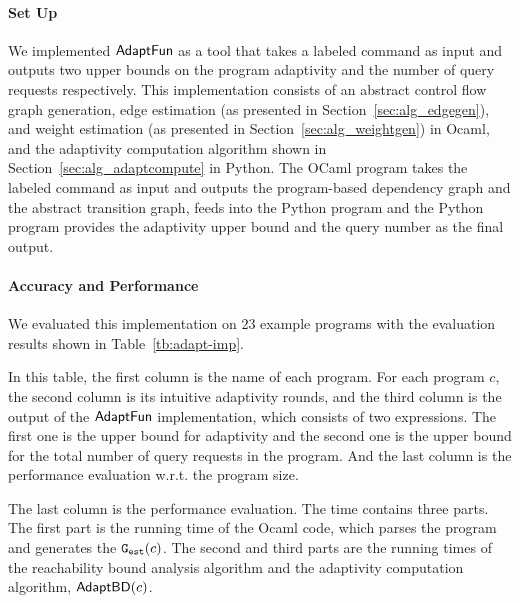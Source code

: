 
\paragraph{Set Up}
We implemented $\textsf{AdaptFun}$ as a tool that takes a labeled command as input 
and outputs two upper bounds on the program adaptivity and the number of query requests respectively.
This implementation consists of an 
abstract control flow graph generation,
edge estimation (as presented in Section~\ref{sec:alg_edgegen}), and weight estimation (as presented in Section~\ref{sec:alg_weightgen}) in Ocaml, 
and the adaptivity computation algorithm shown in Section~\ref{sec:alg_adaptcompute} in Python.
The OCaml program takes the labeled command as input and outputs the program-based dependency graph and
the abstract transition graph,
feeds into the Python program and the Python program provides the adaptivity upper bound and the query number as the final output.


\paragraph{Accuracy and Performance}

We evaluated this implementation on $23$ example programs with the evaluation results shown in Table~\ref{tb:adapt-imp}.

In this table,
the first column is the name of each program.
For each program $c$, the second column is its intuitive adaptivity rounds,
and the third column is the output of the $\textsf{AdaptFun}$ implementation, which consists of two expressions.
The first one is the upper bound for adaptivity and the second one is the 
upper bound for the total number of query requests in the program. And the last column is the performance evaluation w.r.t. the program size.

The last column is the performance evaluation.
The time contains three parts. The first part is the running time of the Ocaml code, which parses the program and generates the $\mathtt{{G_{est}}}(c)$.
The second and third parts are the running times of the reachability bound analysis algorithm
and the adaptivity computation algorithm, $\mathsf{AdaptBD}(c)$.

